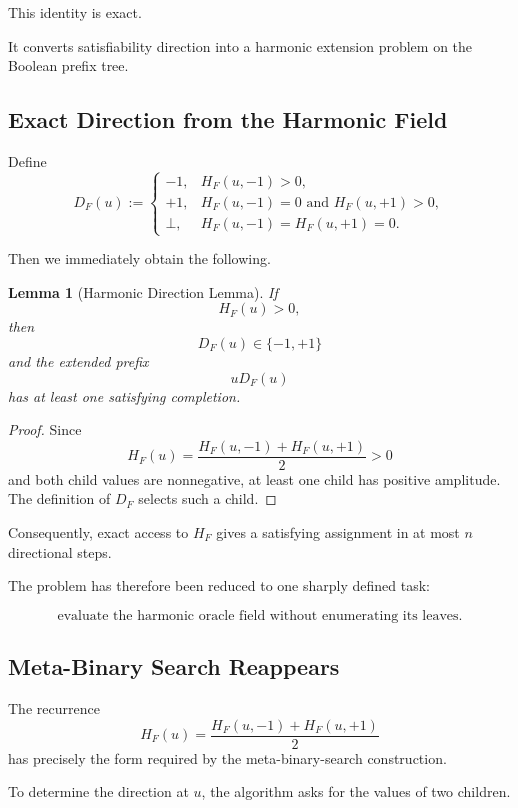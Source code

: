 \documentclass[11pt]{article}
\theoremstyle{plain}
\newtheorem{lemma}[theorem]{Lemma}
\theoremstyle{definition}
\begin{document}
This identity is exact.

It converts satisfiability direction into a harmonic extension problem on the
Boolean prefix tree.

\subsection{Exact Direction from the Harmonic Field}

Define
\[
    D_F(u)
    :=
    \begin{cases}
        -1,
        &H_F(u,-1)>0,
        \\[3pt]
        +1,
        &H_F(u,-1)=0
        \text{ and }
        H_F(u,+1)>0,
        \\[3pt]
        \bot,
        &H_F(u,-1)=H_F(u,+1)=0.
    \end{cases}
\]

Then we immediately obtain the following.

\begin{lemma}[Harmonic Direction Lemma]
\label{lem:harmonic-direction}
If
\[
    H_F(u)>0,
\]
then
\[
    D_F(u)\in\{-1,+1\}
\]
and the extended prefix
\[
    uD_F(u)
\]
has at least one satisfying completion.
\end{lemma}

\begin{proof}
Since
\[
    H_F(u)
    =
    \frac{
        H_F(u,-1)+H_F(u,+1)
    }{2}
    >0
\]
and both child values are nonnegative, at least one child has positive
amplitude.  The definition of \(D_F\) selects such a child.
\end{proof}

Consequently, exact access to \(H_F\) gives a satisfying assignment in at most
\(n\) directional steps.

The problem has therefore been reduced to one sharply defined task:

\[
\boxed{
\text{evaluate the harmonic oracle field without enumerating its leaves}.
}
\]

\subsection{Meta-Binary Search Reappears}

The recurrence
\[
    H_F(u)
    =
    \frac{
        H_F(u,-1)+H_F(u,+1)
    }{2}
\]
has precisely the form required by the meta-binary-search construction.

To determine the direction at \(u\), the algorithm asks for the values of two
children.
\end{document}
